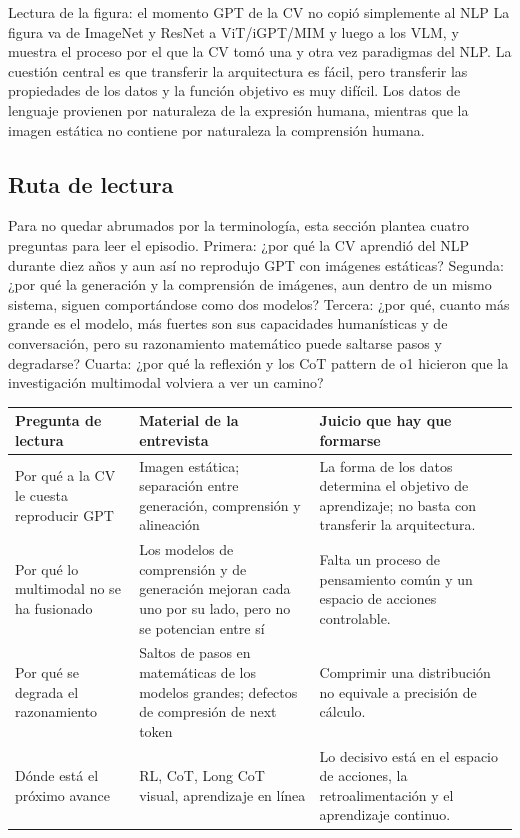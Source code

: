 \begin{knowledgebox}{Lectura de la figura: el momento GPT de la CV no copió simplemente al NLP}
La figura va de ImageNet y ResNet a ViT/iGPT/MIM y luego a los VLM, y muestra el proceso por el que la CV tomó una y otra vez paradigmas del NLP. La cuestión central es que transferir la arquitectura es fácil, pero transferir las propiedades de los datos y la función objetivo es muy difícil. Los datos de lenguaje provienen por naturaleza de la expresión humana, mientras que la imagen estática no contiene por naturaleza la comprensión humana.
\end{knowledgebox}

\subsection{Ruta de lectura}

Para no quedar abrumados por la terminología, esta sección plantea cuatro preguntas para leer el episodio. Primera: ¿por qué la CV aprendió del NLP durante diez años y aun así no reprodujo GPT con imágenes estáticas? Segunda: ¿por qué la generación y la comprensión de imágenes, aun dentro de un mismo sistema, siguen comportándose como dos modelos? Tercera: ¿por qué, cuanto más grande es el modelo, más fuertes son sus capacidades humanísticas y de conversación, pero su razonamiento matemático puede saltarse pasos y degradarse? Cuarta: ¿por qué la reflexión y los CoT pattern de o1 hicieron que la investigación multimodal volviera a ver un camino?

\noindent\begin{tabularx}{\textwidth}{p{}p{}X}
\toprule
Pregunta de lectura & Material de la entrevista & Juicio que hay que formarse \\
\midrule
Por qué a la CV le cuesta reproducir GPT & Imagen estática; separación entre generación, comprensión y alineación & La forma de los datos determina el objetivo de aprendizaje; no basta con transferir la arquitectura. \\
Por qué lo multimodal no se ha fusionado & Los modelos de comprensión y de generación mejoran cada uno por su lado, pero no se potencian entre sí & Falta un proceso de pensamiento común y un espacio de acciones controlable. \\
Por qué se degrada el razonamiento & Saltos de pasos en matemáticas de los modelos grandes; defectos de compresión de next token & Comprimir una distribución no equivale a precisión de cálculo. \\
Dónde está el próximo avance & RL, CoT, Long CoT visual, aprendizaje en línea & Lo decisivo está en el espacio de acciones, la retroalimentación y el aprendizaje continuo. \\
\bottomrule
\end{tabularx}

